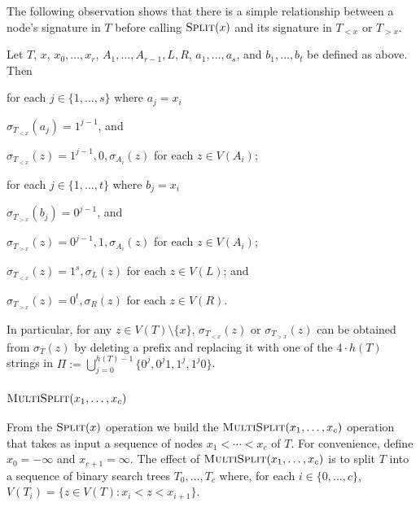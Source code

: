 \documentclass[kpfonts]{patmorin}
\begin{document}
The following observation shows that there is a simple relationship between a node's signature in $T$ before calling $\textsc{Split}(x)$ and its signature in $T_{<x}$ or $T_{>x}$.

\begin{obs}
  Let $T$, $x$, $x_0,\dots,x_r$, $A_1,\dots,A_{r-1},L,R$, $a_1,\dots,a_s$, and $b_1,\dots,b_t$ be defined as above. Then
  \begin{compactenum}
    \item for each $j\in\{1,\dots,s\}$ where $a_j=x_i$
    \begin{compactenum}
      \item $\sigma_{T_{<x}}(a_j)=1^{j-1}$, and
      \item $\sigma_{T_{<x}}(z) = 1^{j-1},0,\sigma_{A_i}(z)$ for each $z\in V(A_i)$;
    \end{compactenum}
    \item for each $j\in\{1,\dots,t\}$ where $b_j=x_i$
    \begin{compactenum}
      \item $\sigma_{T_{>x}}(b_j)=0^{j-1}$, and
      \item $\sigma_{T_{>x}}(z) = 0^{j-1},1,\sigma_{A_i}(z)$ for each $z\in V(A_i)$;
    \end{compactenum}
    \item $\sigma_{T_{<x}}(z)=1^s,\sigma_L(z)$ for each $z\in V(L)$; and
    \item $\sigma_{T_{>x}}(z)=0^t,\sigma_R(z)$ for each $z\in V(R)$.
  \end{compactenum}
  In particular, for any $z\in V(T)\setminus\{x\}$, $\sigma_{T_{<x}}(z)$ or $\sigma_{T_{>x}}(z)$ can be obtained from $\sigma_T(z)$ by deleting a prefix and replacing it with one of the $4\cdot h(T)$ strings in $\Pi:=\bigcup_{j=0}^{h(T)-1}\{0^j,0^j1,1^j,1^j0\}$.
\end{obs}

\subsubsection{$\textsc{MultiSplit}(x_1,\dots,x_c)$}

From the $\textsc{Split}(x)$ operation we build the $\textsc{MultiSplit}(x_1,\dots,x_c)$ operation that takes as input a sequence of nodes $x_1<\cdots<x_c$ of $T$.  For convenience, define $x_0=-\infty$ and $x_{c+1}=\infty$.  The effect of $\textsc{MultiSplit}(x_1,\dots,x_c)$ is to split $T$ into a sequence of binary search trees $T_0,\dots,T_{c}$ where, for each $i\in\{0,\dots,c\}$, $V(T_i)=\{z\in V(T): x_i< z<x_{i+1}\}$.
\end{document}
